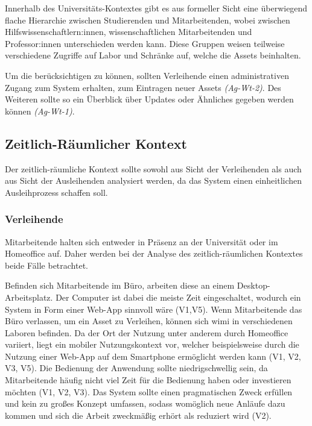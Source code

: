Innerhalb des Universitäts-Kontextes gibt es aus formeller Sicht eine überwiegend flache Hierarchie
zwischen Studierenden und Mitarbeitenden, wobei zwischen Hilfswissenschaftlern:innen,
wissenschaftlichen Mitarbeitenden und Professor:innen unterschieden werden kann. Diese Gruppen
weisen teilweise verschiedene Zugriffe auf Labor und Schränke auf, welche die Assets beinhalten.

Um die  berücksichtigen zu können, sollten Verleihende einen administrativen
Zugang zum System erhalten, zum Eintragen neuer Assets \textit{(Ag-Wt-2)}. Des Weiteren sollte so
ein Überblick über Updates oder Ähnliches  gegeben werden können \textit{(Ag-Wt-1)}.


\subsection{Zeitlich-Räumlicher Kontext}
\label{section:zeit}
Der zeitlich-räumliche Kontext sollte sowohl aus Sicht der Verleihenden als auch aus Sicht der
Ausleihenden analysiert werden, da das System einen einheitlichen Ausleihprozess schaffen soll.

\subsubsection{Verleihende}
Mitarbeitende halten sich entweder in Präsenz an der Universität oder im Homeoffice auf. Daher
werden bei der Analyse des zeitlich-räumlichen Kontextes beide Fälle betrachtet.

Befinden sich Mitarbeitende im Büro, arbeiten diese an einem Desktop-Arbeitsplatz. Der Computer ist
dabei die meiste Zeit eingeschaltet, wodurch ein System in Form einer Web-App sinnvoll wäre (V1,V5).
Wenn Mitarbeitende das Büro verlassen, um ein Asset zu Verleihen, können sich \ac{wimi} in
verschiedenen Laboren befinden. Da der Ort der Nutzung unter anderem durch Homeoffice variiert,
liegt ein mobiler Nutzungskontext vor, welcher beispielsweise durch die Nutzung einer Web-App auf
dem Smartphone ermöglicht werden kann (V1, V2, V3, V5). Die Bedienung der Anwendung sollte
niedrigschwellig sein, da Mitarbeitende häufig nicht viel Zeit für die Bedienung haben oder
investieren möchten (V1, V2, V3). Das System sollte einen pragmatischen Zweck erfüllen und kein zu
großes Konzept umfassen, sodass womöglich neue Anläufe dazu kommen und sich die Arbeit zweckmäßig
erhört als reduziert wird (V2).


